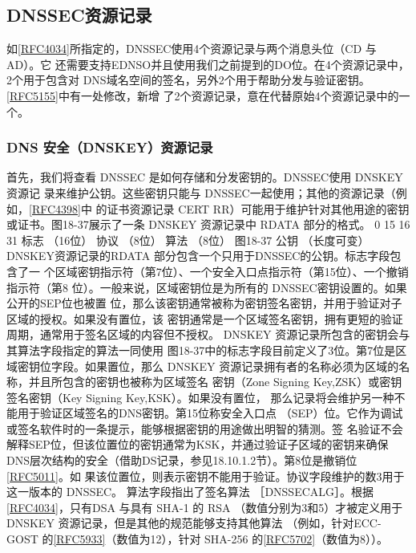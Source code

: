 \subsection{DNSSEC资源记录}
如\href{https://www.rfc-editor.org/rfc/rfc4034}{[RFC4034]}所指定的，DNSSEC使用4个资源记录与两个消息头位（CD 与AD）。它
还需要支持EDNSO并且使用我们之前提到的DO位。在4个资源记录中，2个用于包含对
DNS域名空间的签名，另外2个用于帮助分发与验证密钥。\href{https://www.rfc-editor.org/rfc/rfc5155}{[RFC5155]}中有一处修改，新增
了2个资源记录，意在代替原始4个资源记录中的一个。

\subsubsection{DNS 安全（DNSKEY）资源记录}
首先，我们将查看 DNSSEC 是如何存储和分发密钥的。DNSSEC使用 DNSKEY 资源记
录来维护公钥。这些密钥只能与 DNSSEC一起使用；其他的资源记录（例如，\href{https://www.rfc-editor.org/rfc/rfc4398}{[RFC4398]}中
的证书资源记录 CERT RR）可能用于维护针对其他用途的密钥或证书。图18-37展示了一条
DNSKEY 资源记录中 RDATA 部分的格式。
0
15 16
31
标志
（16位）
协议
（8位）
算法
（8位）
图18-37
公钥
（长度可变）
DNSKEY资源记录的RDATA 部分包含一个只用于DNSSEC的公钥。标志字段包含了一
个区域密钥指示符（第7位）、一个安全入口点指示符（第15位）、一个撤销指示符（第8
位）。一般来说，区域密钥位是为所有的 DNSSEC密钥设置的。如果公开的SEP位也被置
位，那么该密钥通常被称为密钥签名密钥，并用于验证对子区域的授权。如果没有置位，该
密钥通常是一个区域签名密钥，拥有更短的验证周期，通常用于签名区域的内容但不授权。
DNSKEY 资源记录所包含的密钥会与其算法字段指定的算法一同使用
图18-37中的标志字段目前定义了3位。第7位是区域密钥位字段。如果置位，那么
DNSKEY 资源记录拥有者的名称必须为区域的名称，并且所包含的密钥也被称为区域签名
密钥（Zone Signing Key,ZSK）或密钥签名密钥（Key Signing Key,KSK）。如果没有置位，
那么记录将会维护另一种不能用于验证区域签名的DNS密钥。第15位称安全入口点
（SEP）位。它作为调试或签名软件时的一条提示，能够根据密钥的用途做出明智的猜测。签
名验证不会解释SEP位，但该位置位的密钥通常为KSK，并通过验证子区域的密钥来确保
DNS层次结构的安全（借助DS记录，参见18.10.1.2节）。第8位是撤销位\href{https://www.rfc-editor.org/rfc/rfc5011}{[RFC5011]}。如
果该位置位，则表示密钥不能用于验证。协议字段维护的数3用于这一版本的 DNSSEC。
算法字段指出了签名算法 ［DNSSECALG］。根据\href{https://www.rfc-editor.org/rfc/rfc4034}{[RFC4034]}，只有DSA 与具有 SHA-1 的 RSA
（数值分别为3和5）才被定义用于 DNSKEY 资源记录，但是其他的规范能够支持其他算法
（例如，针对ECC-GOST 的\href{https://www.rfc-editor.org/rfc/rfc5933}{[RFC5933]}（数值为12），针对 SHA-256 的\href{https://www.rfc-editor.org/rfc/rfc5702}{[RFC5702]}（数值为8））。
